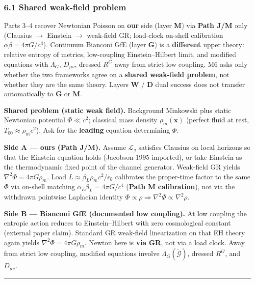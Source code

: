 \documentclass[
  11pt,
]{article}
\begin{document}
\subsubsection{6.1 Shared weak-field problem}\label{shared-weak-field-problem}

Parts 3--4 recover Newtonian Poisson on \textbf{our} side (layer \textbf{M}) via \textbf{Path J/M} only (Clausius $\rightarrow$ Einstein $\rightarrow$ weak-field GR; load-clock on-shell calibration \(\alpha\beta=4\pi G/c^4\)). Continuum Bianconi GfE (layer \textbf{G}) is a \textbf{different} upper theory: relative entropy of metrics, low-coupling Einstein--Hilbert limit, and modified equations with \(\Lambda_G\), \(D_{\mu\nu}\), dressed \(R^G\) away from strict low coupling. M6 asks only whether the two frameworks agree on a \textbf{shared weak-field problem}, not whether they are the same theory. Layers \textbf{W} / \textbf{D} dual success does not transfer automatically to \textbf{G} or \textbf{M}.

\textbf{Shared problem (static weak field).} Background Minkowski plus static Newtonian potential \(\Phi\ll c^2\); classical mass density \(\rho_m(\mathbf{x})\) (perfect fluid at rest, \(T_{00}\approx\rho_m c^2\)). Ask for the \textbf{leading} equation determining \(\Phi\).

\textbf{Side A --- ours (Path J/M).} Assume \(\mathcal{L}_g\) satisfies Clausius on local horizons so that the Einstein equation holds (Jacobson 1995 imported), or take Einstein as the thermodynamic fixed point of the channel generator. Weak-field GR yields \(\nabla^2\Phi=4\pi G\rho_m\). Load \(L\approx\beta_L\rho_m c^2/\epsilon_0\) calibrates the proper-time factor to the same \(\Phi\) via on-shell matching \(\alpha_L\beta_L=4\pi G/c^4\) (\textbf{Path M calibration}), not via the withdrawn pointwise Laplacian identity \(\Phi\propto\rho\Rightarrow\nabla^2\Phi\propto\nabla^2\rho\).

\textbf{Side B --- Bianconi GfE (documented low coupling).} At low coupling the entropic action reduces to Einstein--Hilbert with zero cosmological constant (external paper claim). Standard GR weak-field linearization on that EH theory again yields \(\nabla^2\Phi=4\pi G\rho_m\). Newton here is \textbf{via GR}, not via a load clock. Away from strict low coupling, modified equations involve \(\Lambda_G(\tilde{\mathcal{G}})\), dressed \(R^G\), and \(D_{\mu\nu}\).

\begin{center}\rule{0.5\linewidth}{0.5pt}\end{center}
\end{document}
